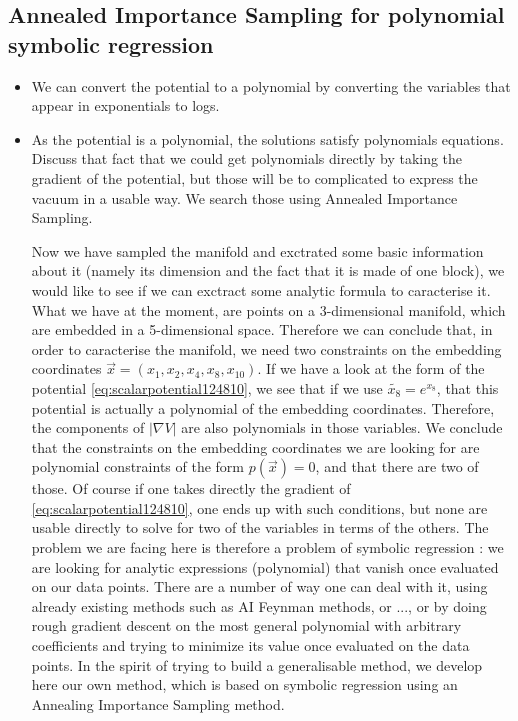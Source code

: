 \documentclass[11pt]{article}
\begin{document}
	\subsection{Annealed Importance Sampling for polynomial symbolic regression}
	\begin{itemize}[label=\textbullet]
		\item We can convert the potential to a polynomial by converting the variables that appear in exponentials to logs.
		\item As the potential is a polynomial, the solutions satisfy polynomials equations. Discuss that fact that we could get polynomials directly by taking the gradient of the potential, but those will be to complicated to express the vacuum in a usable way.  We search those using Annealed Importance Sampling.
		
		Now we have sampled the manifold and exctrated some basic information about it (namely its dimension and the fact that it is made of one block), we would like to see if we can exctract some analytic formula to caracterise it. What we have at the moment, are points on a 3-dimensional manifold, which are embedded in a 5-dimensional space. Therefore we can conclude that, in order to caracterise the manifold, we need two constraints on the embedding coordinates $\vec{x} = (x_1,x_2,x_4,x_8,x_{10})$. If we have a look at the form of the potential \eqref{eq:scalarpotential124810}, we see that if we use $\tilde{x_{8}} = e^{x_8}$, that this potential is actually a polynomial of the embedding coordinates. Therefore, the components of $|\nabla V|$ are also polynomials in those variables. We conclude that the constraints on the embedding coordinates we are looking for are polynomial constraints of the form $p(\vec{x}) = 0$, and that there are two of those. Of course if one takes directly the gradient of \eqref{eq:scalarpotential124810}, one ends up with such conditions, but none are usable directly to solve for two of the variables in terms of the others. The problem we are facing here is therefore a problem of symbolic regression : we are looking for analytic expressions (polynomial) that vanish once evaluated on our data points. There are a number of way one can deal with it, using already existing methods such as AI Feynman methods, or ..., or by doing rough gradient descent on the most general polynomial with arbitrary coefficients and trying to minimize its value once evaluated on the data points. In the spirit of trying to build a generalisable method, we develop here our own method, which is based on symbolic regression using an Annealing Importance Sampling method. 


\end{itemize}
\end{document}
